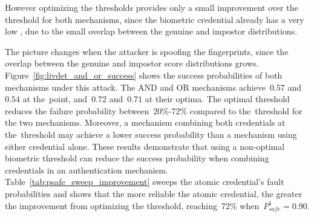 \documentclass[conference,compsoc]{IEEEtran}
\begin{document}
However optimizing the thresholds provides only a small improvement over the \EER threshold for both mechanisms, since the biometric credential already has a very low \EER, due to the small overlap between the genuine and impostor distributions.

The picture changes when the attacker is spoofing the fingerprints, since the overlap between the genuine and impostor score distributions grows. Figure~\ref{fig:livdet_and_or_success} shows the success probabilities of both mechanisms under this attack. The AND and OR mechanisms achieve~$0.57$ and~$0.54$ at the~\EER point, and~$0.72$ and~$0.71$ at their optima. The optimal threshold reduces the failure probability between~20\%-72\% compared to the~\EER threshold for the two mechanisms. Moreover, a mechanism combining both credentials at the~\EER threshold may achieve a lower success probability than a mechanism using either credential alone. These results demonstrate that using a non-optimal biometric threshold can reduce the success probability when combining credentials in an authentication mechanism. Table~\ref{tab:psafe_sweep_improvement} sweeps the atomic credential's fault probabilities and shows that the more reliable the atomic credential, the greater the improvement from optimizing the threshold, reaching~72\% when~$P^1_{safe} = 0.90$.
\end{document}
